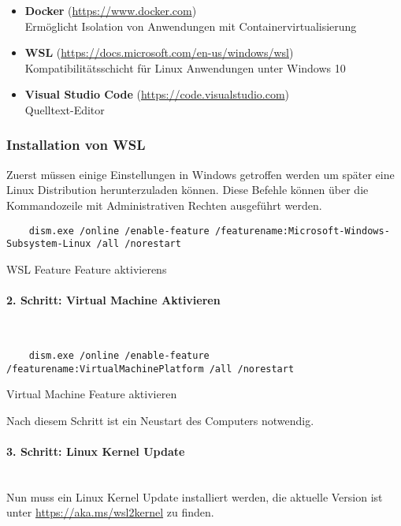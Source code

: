 \begin{itemize}
  \item \textbf{Docker} (\url{https://www.docker.com}) \\ Ermöglicht Isolation
        von Anwendungen mit Containervirtualisierung
  \item \textbf{WSL} (\url{https://docs.microsoft.com/en-us/windows/wsl}) \\
        Kompatibilitätsschicht für Linux Anwendungen unter Windows 10
  \item \textbf{Visual Studio Code} (\url{https://code.visualstudio.com}) \\
        Quelltext-Editor
\end{itemize}


\subsubsection{Installation von WSL}
Zuerst müssen einige Einstellungen in Windows getroffen werden um später eine
Linux Distribution herunterzuladen können. Diese Befehle können über die
Kommandozeile mit Administrativen Rechten ausgeführt werden.

\begin{listing}[H]
  \begin{verbatim}
    dism.exe /online /enable-feature /featurename:Microsoft-Windows-Subsystem-Linux /all /norestart
  \end{verbatim}
  \caption{WSL Feature Feature aktivierens}
\end{listing}

\paragraph{2. Schritt: Virtual Machine Aktivieren}\mbox{}\\
\begin{listing}[H]
  \begin{verbatim}
    dism.exe /online /enable-feature /featurename:VirtualMachinePlatform /all /norestart
  \end{verbatim}
  \caption{Virtual Machine Feature aktivieren}
\end{listing}

Nach diesem Schritt ist ein Neustart des Computers notwendig.

\paragraph{3. Schritt: Linux Kernel Update}\mbox{}\\
Nun muss ein Linux Kernel Update installiert werden, die aktuelle Version ist
unter \url{https://aka.ms/wsl2kernel} zu finden.

